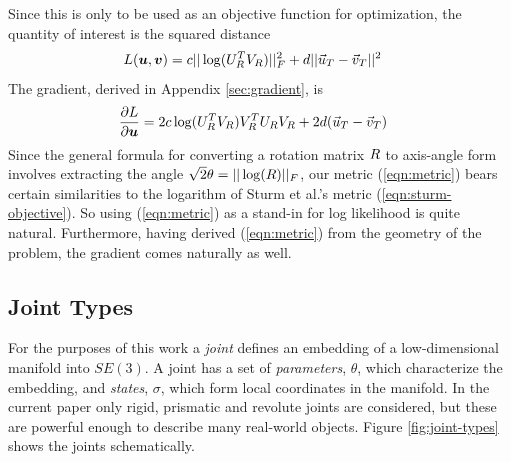 \documentclass[letterpaper, 10 pt, conference]{ieeeconf}  %
\newcommand\deriv[2]{\ensuremath{\frac{\partial #1}{\partial #2}}}
\def\xmat{\uppercase}    \def\xmatstr{in uppercase}
\def\xvec{\vec}          \def\xvecstr{with an arrow}
\def\xse{\bm}            \def\xsestr{in boldface}
\begin{document}
Since this is only to be used as an objective function for optimization, the quantity of interest is the squared distance
\begin{align}
  L&(\xse{u},\xse{v}) = c ||\log(\xmat{u}_R^T \xmat{v}_R)||_F^2 + d ||\xvec{u}_T - \xvec{v}_T||^2 \label{eqn:metric}
\end{align}
The gradient, derived in Appendix \ref{sec:gradient}, is
\begin{align}
  \deriv{L}{\xse{u}} &= 2c\log(\xmat{u}_R^T\xmat{v}_R)\xmat{v}_R^T\xmat{u}_R\xmat{v}_R + 2d(\xvec{u}_T-\xvec{v}_T)
\end{align}
Since the general formula for converting a rotation matrix $\xmat{r}$ to axis-angle form involves extracting the angle ${\sqrt{2}\theta = ||\log(\xmat{r})||_F}$, our metric (\ref{eqn:metric}) bears certain similarities to the logarithm of Sturm et al.'s metric (\ref{eqn:sturm-objective}). So using (\ref{eqn:metric}) as a stand-in for log likelihood is quite natural. Furthermore, having derived (\ref{eqn:metric}) from the geometry of the problem, the gradient comes naturally as well.

\subsection{Joint Types}\label{sec:joint-types}
For the purposes of this work a \emph{joint} defines an embedding of a low-dimensional manifold into $SE(3)$. A joint has a set of \emph{parameters}, $\theta$, which characterize the embedding, and \emph{states}, $\sigma$, which form local coordinates in the manifold. In the current paper only rigid, prismatic and revolute joints are considered, but these are powerful enough to describe many real-world objects. Figure \ref{fig:joint-types} shows the joints schematically.
\end{document}
